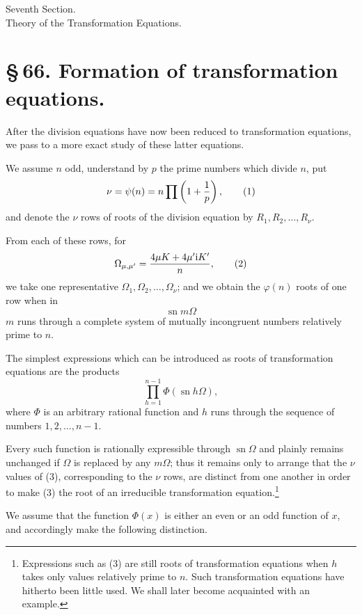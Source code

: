 \documentclass[11pt]{article}
\providecommand{\ii}{\mathrm{i}}
\providecommand{\sn}{\operatorname{sn}}
\begin{document}
\begin{center}
{\large Seventh Section.}\\[0.7em]
{\Large Theory of the Transformation Equations.}
\end{center}

\section*{\S\,66. Formation of transformation equations.}

After the division equations have now been reduced to transformation equations, we pass to a more exact study of these latter equations.

We assume $n$ odd, understand by $p$ the prime numbers which divide $n$, put
\begin{equation}
\nu=\psi(n)=n\prod\left(1+{1\over p}\right),
\tag{1}
\end{equation}
and denote the $\nu$ rows of roots of the division equation by $R_1,R_2,\ldots,R_\nu$.

From each of these rows, for
\begin{equation}
\Omega_{\mu,\mu'}={4\mu K+4\mu'\ii K'\over n},
\tag{2}
\end{equation}
we take one representative $\Omega_1,\Omega_2,\ldots,\Omega_\nu$; and we obtain the $\varphi(n)$ roots of one row when in
\[
\sn m\Omega
\]
$m$ runs through a complete system of mutually incongruent numbers relatively prime to $n$.

The simplest expressions which can be introduced as roots of transformation equations are the products
\begin{equation}
\prod_{h=1}^{n-1}\Phi(\sn h\Omega),
\tag{3}
\end{equation}
where $\Phi$ is an arbitrary rational function and $h$ runs through the sequence of numbers $1,2,\ldots,n-1$.

Every such function is rationally expressible through $\sn\Omega$ and plainly remains unchanged if $\Omega$ is replaced by any $m\Omega$; thus it remains only to arrange that the $\nu$ values of (3), corresponding to the $\nu$ rows, are distinct from one another in order to make (3) the root of an irreducible transformation equation.\footnote{Expressions such as (3) are still roots of transformation equations when $h$ takes only values relatively prime to $n$. Such transformation equations have hitherto been little used. We shall later become acquainted with an example.}

We assume that the function $\Phi(x)$ is either an even or an odd function of $x$, and accordingly make the following distinction.
\end{document}

